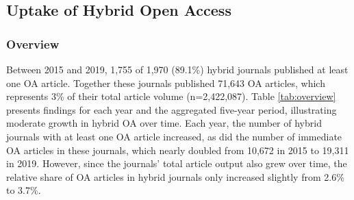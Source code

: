 \documentclass[a4paper,man,floatsintext,longtable,noextraspace,12pt]{apa6}
\begin{document}
\hypertarget{uptake-of-hybrid-open-access}{%
\subsection*{Uptake of Hybrid Open
Access}\label{uptake-of-hybrid-open-access}}

\hypertarget{overview}{%
\subsubsection*{Overview}\label{overview}}

Between 2015 and 2019, 1,755 of 1,970 (89.1\%) hybrid journals published
at least one OA article. Together these journals published 71,643 OA
articles, which represents 3\% of their total article volume
(n=2,422,087). Table \ref{tab:overview} presents findings for each year
and the aggregated five-year period, illustrating moderate growth in
hybrid OA over time. Each year, the number of hybrid journals with at
least one OA article increased, as did the number of immediate OA
articles in these journals, which nearly doubled from 10,672 in 2015 to
19,311 in 2019. However, since the journals' total article output also
grew over time, the relative share of OA articles in hybrid journals
only increased slightly from 2.6\% to 3.7\%.
\end{document}
